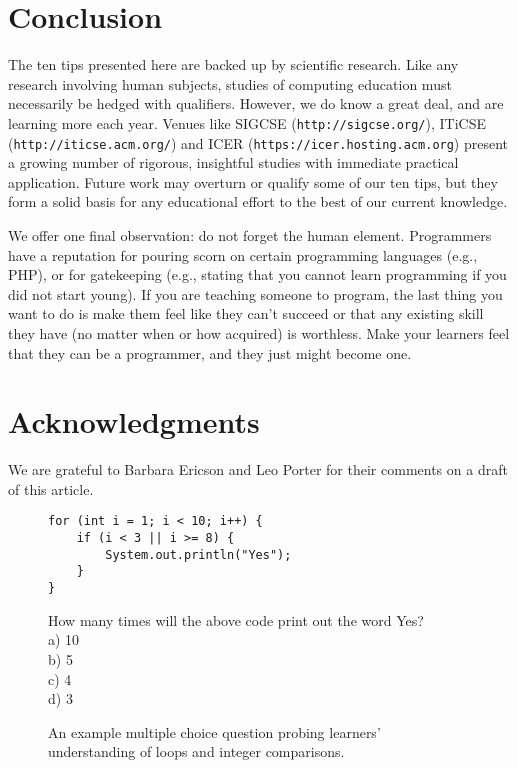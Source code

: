 \documentclass[10pt,letterpaper]{article}
\newcommand{\url}[1]{\texttt{#1}}
\begin{document}
\section*{Conclusion}

The ten tips presented here are backed up by scientific research.
Like any research involving human subjects,
studies of computing education must necessarily be hedged with qualifiers.
However,
we do know a great deal,
and are learning more each year.
Venues like SIGCSE (\url{http://sigcse.org/}), ITiCSE (\url{http://iticse.acm.org/}) and ICER (\url{https://icer.hosting.acm.org})
present a growing number of rigorous, insightful studies
with immediate practical application.
Future work may overturn or qualify some of our ten tips,
but they form a solid basis for any educational effort to the best of our current knowledge.

We offer one final observation: do not forget the human element.
Programmers have a reputation for pouring scorn on certain programming languages (e.g., PHP),
or for gatekeeping (e.g., stating that you cannot learn programming if you did not start young).
If you are teaching someone to program,
the last thing you want to do is make them feel like they can't succeed
or that any existing skill they have (no matter when or how acquired) is worthless.
Make your learners feel that they can be a programmer,
and they just might become one.

\section*{Acknowledgments}

We are grateful to Barbara Ericson and Leo Porter for their comments on a draft of this article.

\pagebreak

\begin{figure}[h]
\begin{mdframed}
\begin{verbatim}
for (int i = 1; i < 10; i++) {
    if (i < 3 || i >= 8) {
        System.out.println("Yes");
    }
}
\end{verbatim}
How many times will the above code print out the word Yes?\\
a) 10\\
b) 5\\
c) 4\\
d) 3
\end{mdframed}
\caption{An example multiple choice question probing learners' understanding of loops and integer comparisons.}
\label{fig:mcq}
\end{figure}
\end{document}
